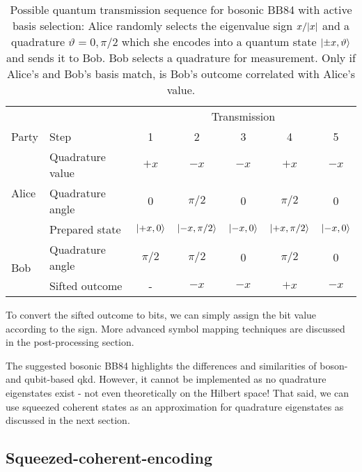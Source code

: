 \begin{table}[htb]
	\centering
	\begin{tabular}{llccccc}
		\toprule
		& & \multicolumn{5}{c}{Transmission} \\
		\cmidrule{3-7}
		Party & Step & 1 & 2 & 3 & 4 & 5 \\ 
		\midrule
		\multirow{3}{*}{Alice} & Quadrature value & $+x$ & $-x$ & $-x$ & $+x$ & $-x$ \\
		& Quadrature angle & $0$ & $\pi/2$ & $0$ & $\pi/2$ & $0$ \\
		& Prepared state & $\ket{+x,0}$ & $\ket{-x,\pi/2}$ & $\ket{-x,0}$ & $\ket{+x,\pi/2}$ & $\ket{-x,0}$ \\
		\cmidrule{1-2}
		\multirow{2}{*}{Bob} & Quadrature angle & $\pi/2$ & $\pi/2$ & $0$ & $\pi/2$ & $0$ \\
		& Sifted outcome & - & $-x$ & $-x$ & $+x$ & $-x$ \\
		\bottomrule
	\end{tabular}
	\caption{Possible quantum transmission sequence for bosonic BB84 with active basis selection: Alice randomly selects the eigenvalue sign $x/\abs{x}$ and a quadrature $\vartheta=0,\pi/2$ which she encodes into a quantum state $\ket{\pm x,\vartheta}$ and sends it to Bob. Bob selects a quadrature for measurement. Only if Alice's and Bob's basis match, is Bob's outcome correlated with Alice's value.}\label{tab:boson_transmission_sequence}
\end{table}
To convert the sifted outcome to bits, we can simply assign the bit value according to the sign.
More advanced symbol mapping techniques are discussed in the post-processing section.

The suggested bosonic BB84 highlights the differences and similarities of boson- and qubit-based \gls{qkd}.
However, it cannot be implemented as no quadrature eigenstates exist - not even theoretically on the Hilbert space!
That said, we can use squeezed coherent states as an approximation for quadrature eigenstates as discussed in the next section.

\FloatBarrier
\subsection{Squeezed-coherent-encoding}

